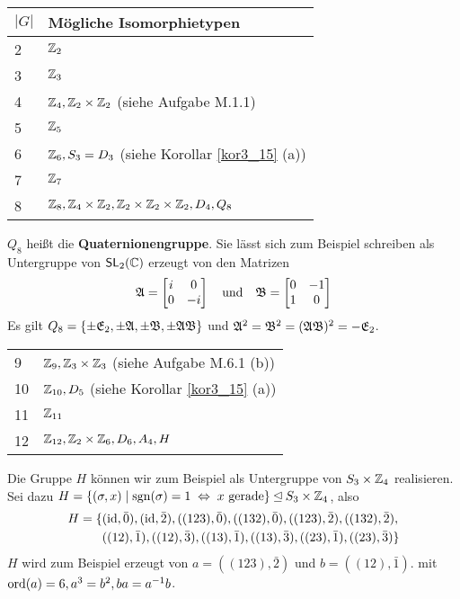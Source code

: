 \begin{beispiel}\label{beispiel3_16}
	\mbox{}
	\begin{center}
		\begin{tabular}{|C{2cm}|L{8cm}|}
			\hline
			$|G|$ & Mögliche Isomorphietypen \\
			 & $\mathbb{Z}_2$ \\
			3 & $\mathbb{Z}_3$ \\
			4 & $\mathbb{Z}_4, \mathbb{Z}_2 \times \mathbb{Z}_2$ (siehe Aufgabe M.1.1) \\
			5 & $\mathbb{Z}_5$ \\
			6 & $\mathbb{Z}_6, S_3 = D_3$ (siehe Korollar \ref{kor3_15} (a)) \\
			7 & $\mathbb{Z}_7$ \\
			8 & $\mathbb{Z}_8, \mathbb{Z}_4 \times \mathbb{Z}_2, \mathbb{Z}_2 \times \mathbb{Z}_2 \times \mathbb{Z}_2, D_4, Q_8$\\
		\end{tabular}
	\end{center}
	$Q_8$ heißt die \textbf{Quaternionengruppe}. Sie lässt sich zum Beispiel schreiben als Untergruppe von $\mathsf{SL}_2(\mathbb{C})$ erzeugt von den Matrizen
	\[\mathfrak{A} = \begin{bmatrix}
		i & 0\\
		0 & -i
	\end{bmatrix}
	\quad\text{und}\quad\mathfrak{B}=\begin{bmatrix}
		0 & -1\\
		1 & 0
	\end{bmatrix}\]
	Es gilt $Q_8 = \{\pm\mathfrak{E}_2, \pm \mathfrak{A}, \pm\mathfrak{B}, \pm\mathfrak{AB}\}$ und $\mathfrak{A}^2 = \mathfrak{B}^2 = (\mathfrak{A}\mathfrak{B})^2 = -\mathfrak{E}_2$.
	\begin{center}
		\begin{tabular}{|C{2cm}|L{8cm}|}
			9 & $\mathbb{Z}_9, \mathbb{Z}_3 \times \mathbb{Z}_3$ (siehe Aufgabe M.6.1 (b))\\
			10 & $\mathbb{Z}_{10}, D_5$ (siehe Korollar \ref{kor3_15} (a))\\
			11 & $\mathbb{Z}_{11}$\\
			12 & $\mathbb{Z}_{12}, \mathbb{Z}_2 \times \mathbb{Z}_6, D_6, A_4, H$
		\end{tabular}
	\end{center}
	Die Gruppe $H$ können wir zum Beispiel als Untergruppe von $S_3 \times \mathbb{Z}_4$ realisieren. Sei dazu $H = \{(\sigma, x) \mid \mathrm{sgn}(\sigma) = 1 \;\Leftrightarrow\; x \text{ gerade}\} \unlhd S_3 \times \mathbb{Z}_4$, also
	\begin{align*}
		H = \{&(\mathrm{id}, \bar{0}),
		(\mathrm{id}, \bar{2}),
		((123), \bar{0}),
		((132), \bar{0}),
		((123), \bar{2}),
		((132), \bar{2}),\\
		&((12), \bar{1}),
		((12), \bar{3}),
		((13), \bar{1}),
		((13), \bar{3}),
		((23), \bar{1}),
		((23), \bar{3})\}
		\end{align*}
		$H$ wird zum Beispiel erzeugt von $a = ((123), \bar{2})$ und $b = ((12), \bar{1})$. mit $\mathrm{ord}(a) = 6, a^3 = b^2, ba = a^{-1} b$.
		

\end{beispiel}
